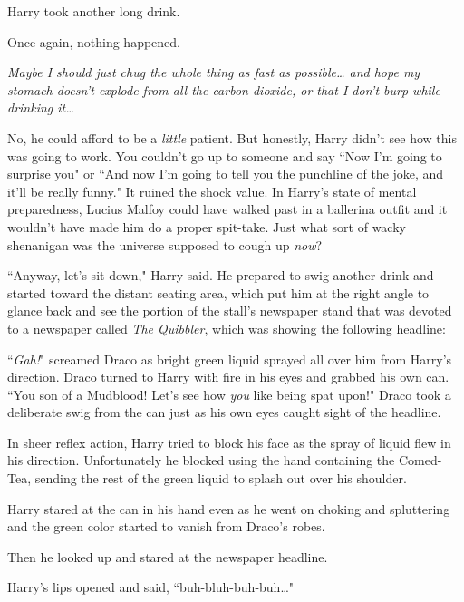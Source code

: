 Harry took another long drink.

Once again, nothing happened.

\emph{Maybe I should just chug the whole thing as fast as possible{\ldots} and hope my stomach doesn't explode from all the carbon dioxide, or that I don't burp while drinking it{\ldots}}

No, he could afford to be a \emph{little} patient. But honestly, Harry didn't see how this was going to work. You couldn't go up to someone and say ``Now I'm going to surprise you" or ``And now I'm going to tell you the punchline of the joke, and it'll be really funny." It ruined the shock value. In Harry's state of mental preparedness, Lucius Malfoy could have walked past in a ballerina outfit and it wouldn't have made him do a proper spit-take. Just what sort of wacky shenanigan was the universe supposed to cough up \emph{now}?

``Anyway, let's sit down," Harry said. He prepared to swig another drink and started toward the distant seating area, which put him at the right angle to glance back and see the portion of the stall's newspaper stand that was devoted to a newspaper called \emph{The Quibbler}, which was showing the following headline:


``\emph{Gah!}" screamed Draco as bright green liquid sprayed all over him from Harry's direction. Draco turned to Harry with fire in his eyes and grabbed his own can. ``You son of a Mudblood! Let's see how \emph{you} like being spat upon!" Draco took a deliberate swig from the can just as his own eyes caught sight of the headline.

In sheer reflex action, Harry tried to block his face as the spray of liquid flew in his direction. Unfortunately he blocked using the hand containing the Comed-Tea, sending the rest of the green liquid to splash out over his shoulder.

Harry stared at the can in his hand even as he went on choking and spluttering and the green color started to vanish from Draco's robes.

Then he looked up and stared at the newspaper headline.


Harry's lips opened and said, ``buh-bluh-buh-buh{\ldots}"

